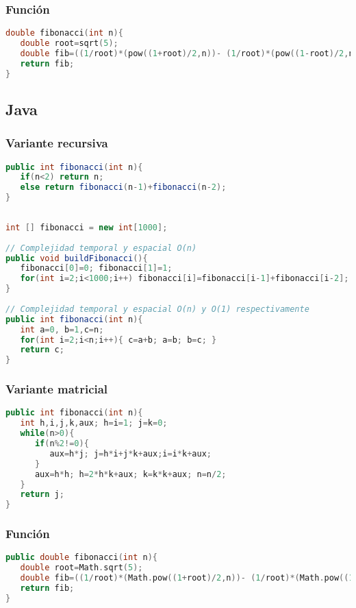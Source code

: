 \subsubsection{Función}

\begin{lstlisting}[language=C++]
double fibonacci(int n){
   double root=sqrt(5);
   double fib=((1/root)*(pow((1+root)/2,n))- (1/root)*(pow((1-root)/2,n)));
   return fib;
}
\end{lstlisting}

\subsection{Java}

\subsubsection{Variante recursiva}

\begin{lstlisting}[language=Java]
public int fibonacci(int n){
   if(n<2) return n;
   else return fibonacci(n-1)+fibonacci(n-2);	
}
\end{lstlisting}


\begin{lstlisting}[language=Java]
	
int [] fibonacci = new int[1000];
	
// Complejidad temporal y espacial O(n)
public void buildFibonacci(){ 
   fibonacci[0]=0; fibonacci[1]=1;
   for(int i=2;i<1000;i++) fibonacci[i]=fibonacci[i-1]+fibonacci[i-2];	
}
	
// Complejidad temporal y espacial O(n) y O(1) respectivamente
public int fibonacci(int n){ 
   int a=0, b=1,c=n;
   for(int i=2;i<n;i++){ c=a+b; a=b; b=c; }
   return c;
}
\end{lstlisting}

\subsubsection{Variante matricial}

\begin{lstlisting}[language=C++]
public int fibonacci(int n){
   int h,i,j,k,aux; h=i=1; j=k=0;
   while(n>0){
      if(n%2!=0){
         aux=h*j; j=h*i+j*k+aux;i=i*k+aux; 
      }
      aux=h*h; h=2*h*k+aux; k=k*k+aux; n=n/2;
   }
   return j;
}
\end{lstlisting}

\subsubsection{Función}

\begin{lstlisting}[language=C++]
public double fibonacci(int n){
   double root=Math.sqrt(5);
   double fib=((1/root)*(Math.pow((1+root)/2,n))- (1/root)*(Math.pow((1-root)/2,n)));
   return fib;
}
\end{lstlisting}